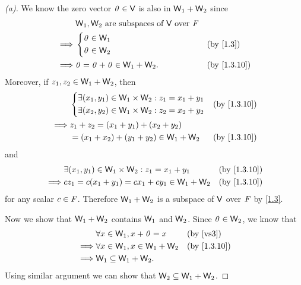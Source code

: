 \begin{proof}[(a)]
	We know the zero vector \(\mathit{0} \in \mathsf{V}\) is also in \(\mathsf{W}_1 + \mathsf{W}_2\) since
	\begin{align*}
		         & \W_1, \W_2 \text{ are subspaces of } \V \text{ over } \F                  \\
		\implies & \begin{dcases}
			           \zv \in \W_1 \\
			           \zv \in \W_2
		           \end{dcases}                                          &  & \by{1.3}       \\
		\implies & \zv = \zv + \zv \in \W_1 + \W_2.                         &  & \by{1.3.10}
	\end{align*}
	Moreover, if \(z_1, z_2 \in \mathsf{W}_1 + \mathsf{W}_2\), then
	\begin{align*}
		         & \begin{dcases}
			           \exists (x_1, y_1) \in \W_1 \times \W_2 : z_1 = x_1 + y_1 \\
			           \exists (x_2, y_2) \in \W_1 \times \W_2 : z_2 = x_2 + y_2
		           \end{dcases} &  & \by{1.3.10}                     \\
		\implies & z_1 + z_2 = (x_1 + y_1) + (x_2 + y_2)                                         \\
		         & = (x_1 + x_2) + (y_1 + y_2) \in \W_1 + \W_2                  &  & \by{1.3.10}
	\end{align*}
	and
	\begin{align*}
		         & \exists (x_1, y_1) \in \W_1 \times \W_2 : z_1 = x_1 + y_1 &  & \by{1.3.10} \\
		\implies & cz_1 = c(x_1 + y_1) = cx_1 + cy_1 \in \W_1 + \W_2         &  & \by{1.3.10}
	\end{align*}
	for any scalar \(c \in \mathit{F}\).
	Therefore \(\mathsf{W}_1 + \mathsf{W}_2\) is a subspace of \(\mathsf{V}\) over \(\mathit{F}\) by \cref{1.3}.

	Now we show that \(\mathsf{W}_1 + \mathsf{W}_2\) contains \(\mathsf{W}_1\) and \(\mathsf{W}_2\).
	Since \(\mathit{0} \in \mathsf{W}_2\), we know that
	\begin{align*}
		         & \forall x \in \W_1, x + \zv = x       &  & \text{(by \ref{vs3})} \\
		\implies & \forall x \in \W_1, x \in \W_1 + \W_2 &  & \by{1.3.10}           \\
		\implies & \W_1 \subseteq \W_1 + \W_2.
	\end{align*}
	Using similar argument we can show that \(\mathsf{W}_2 \subseteq \mathsf{W}_1 + \mathsf{W}_2\).
\end{proof}

